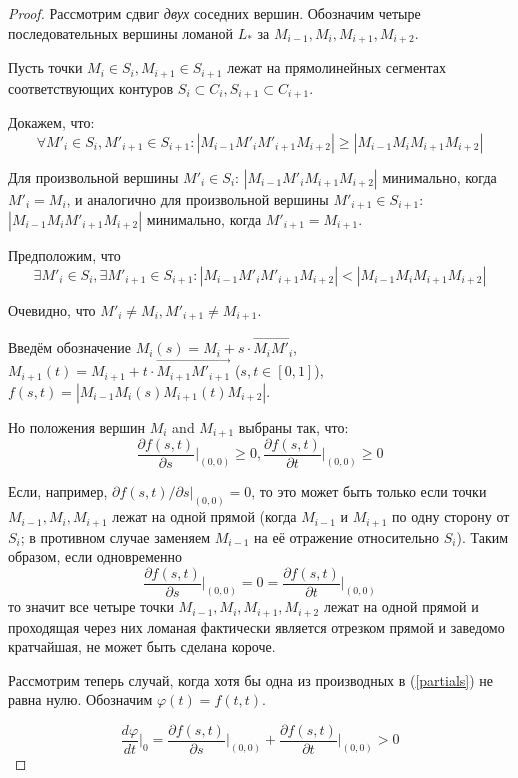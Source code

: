\documentclass[14pt]{extarticle}
\theoremstyle{plain}%
\theoremstyle{remark}
\begin{document}
\begin{proof}
Рассмотрим сдвиг
\textit{двух}
соседних вершин.
Обозначим четыре последовательных вершины ломаной
$L_*$
за
$M_{i-1}, M_i, M_{i+1}, M_{i+2}$.

Пусть точки
$M_i \in S_i,
M_{i+1} \in S_{i+1}$
лежат на прямолинейных сегментах
соответствующих контуров
$S_i \subset C_i,
S_{i+1} \subset C_{i+1}$.

Докажем, что:
$$
\forall M'_i \in S_i,
M'_{i+1} \in S_{i+1}
:
|M_{i-1} M'_i M'_{i+1} M_{i+2}|
\geqslant
|M_{i-1} M_i M_{i+1} M_{i+2}|
$$

Для произвольной вершины
$M'_i \in S_i$:
$|M_{i-1} M'_i M_{i+1} M_{i+2}|$
минимально, когда
$M'_i=M_i$,
и аналогично
для произвольной вершины
$M'_{i+1} \in S_{i+1}$:
$|M_{i-1} M_i M'_{i+1} M_{i+2}|$
минимально, когда
$M'_{i+1}=M_{i+1}$.

Предположим, что
$$
\exists M'_i \in S_i,
\exists M'_{i+1} \in S_{i+1}
:
|M_{i-1} M'_i M'_{i+1} M_{i+2}|
<
|M_{i-1} M_i M_{i+1} M_{i+2}|
$$

Очевидно, что
$
M'_i \ne M_i,
M'_{i+1} \ne M_{i+1}
$.

Введём обозначение
$
M_i(s)=M_i+s \cdot \overrightarrow{M_i M'_i}
$,
$
 M_{i+1}(t)= M_{i+1}+t \cdot \overrightarrow{M_{i+1} M'_{i+1}}
$
($s,t \in[0,1]$),
$f(s,t)=
|M_{i-1} M_i(s) M_{i+1}(t) M_{i+2}|
$.

Но положения вершин
$M_i$ and $M_{i+1}$
выбраны так, что:
\begin{equation}
\frac{\partial f(s,t)}{\partial s} \Big|_{(0,0)} \geqslant 0,
\frac{\partial f(s,t)}{\partial t} \Big|_{(0,0)} \geqslant 0
\label{partials}
\end{equation}

Если,
например,
$\partial f(s,t) / \partial s \big|_{(0,0)} = 0$,
то это может быть только если точки
$M_{i-1}, M_i, M_{i+1}$
лежат на одной прямой
(когда
$M_{i-1}$
и
$M_{i+1}$
по одну сторону от
$S_i$;
в противном случае
заменяем
$M_{i-1}$
на её отражение относительно
$S_i$).
Таким образом,
если одновременно
$$
\frac{\partial f(s,t)}{\partial s} \Big|_{(0,0)}
= 0 =
\frac{\partial f(s,t)}{\partial t} \Big|_{(0,0)}
$$
то значит все четыре точки
$M_{i-1}, M_i, M_{i+1}, M_{i+2}$
лежат на одной прямой
и проходящая через них ломаная
фактически является отрезком прямой
и заведомо кратчайшая,
не может быть сделана короче.

Рассмотрим теперь случай,
когда хотя бы одна из производных в
(\ref{partials})
не равна нулю.
Обозначим
$\varphi(t)=f(t,t)$.

$$
\frac{d\varphi}{dt} \Big|_0 =
\frac{\partial f(s,t)}{\partial s} \Big|_{(0,0)}
+
\frac{\partial f(s,t)}{\partial t} \Big|_{(0,0)}
>0
$$


\end{proof}
\end{document}
